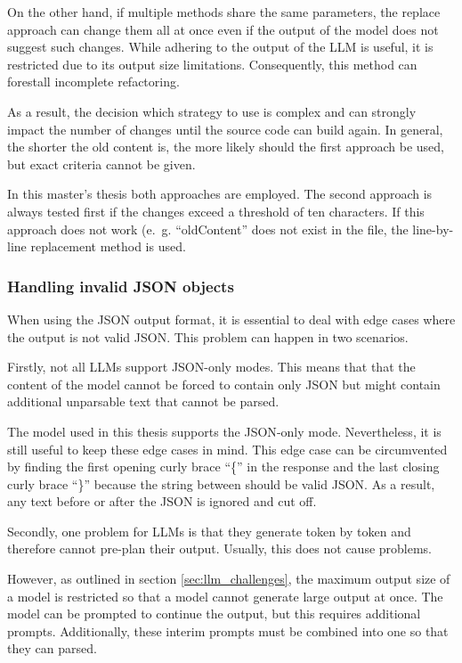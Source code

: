 On the other hand, if multiple methods share the same parameters, the replace approach can change them all at once even if the output of the model does not suggest such changes. While adhering to the output of the \ac{LLM} is useful, it is restricted due to its output size limitations. Consequently,  this method can forestall incomplete refactoring. 

As a result, the decision which strategy to use is complex and can strongly impact the number of changes until the source code can build again. In general, the shorter the old content is, the more likely should the first approach be used, but exact criteria cannot be given. 


In this master's thesis both approaches are employed. The second approach is always tested first if the changes exceed a threshold of ten characters. If this approach does not work (e.~g. \enquote{oldContent} does not exist in the file, the line-by-line replacement method is used.  

\subsubsection{Handling invalid \ac{JSON} objects}

When using the \ac{JSON} output format, it is essential to deal with edge cases where the output is not valid \ac{JSON}. This problem can happen in two scenarios.

Firstly, not all \acp{LLM} support \ac{JSON}-only modes. This means that that the content of the model cannot be forced to contain only \ac{JSON} but might contain additional unparsable text that cannot be parsed. 

The model used in this thesis supports the \ac{JSON}-only mode. Nevertheless, it is still useful to keep these edge cases in mind. This edge case can be circumvented by finding the first opening curly brace \enquote{\{} in the response and the last closing curly brace \enquote{\}} because the string between should be valid \ac{JSON}. 
As a result, any text before or after the \ac{JSON} is ignored and cut off. 

Secondly, one problem for \acp{LLM} is that they generate token by token and therefore cannot pre-plan their output. Usually, this does not cause problems. 

However, as outlined in section \ref{sec:llm_challenges}, the maximum output size of a model is restricted so that a model cannot generate large output at once. The model can be prompted to continue the output, but this requires additional prompts. Additionally, these interim prompts must be combined into one so that they can parsed.

